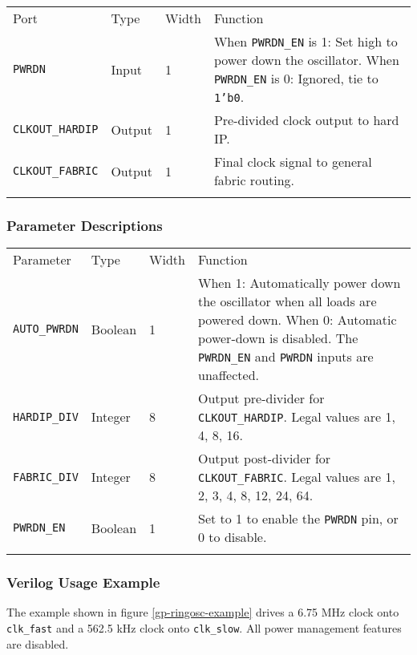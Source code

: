 \documentclass[11pt]{article}
\newcommand{\tokenstyle}[1]{\texttt{#1}}
\newcommand{\wirestyle}[1]{\texttt{#1}}
\newcommand{\datastyle}[1]{\texttt{#1}}
\newcommand{\whenstyle}[1]{{\fontseries{sb}\selectfont#1}}
\newcommand{\thinhline}{\Xhline{1\arrayrulewidth}}
\newcommand{\thickhline}{\Xhline{2.5\arrayrulewidth}}
\begin{document}
\begin{tabularx}{\textwidth}{lllX}
\thinhline
\whenstyle{Port} & \whenstyle{Type} & \whenstyle{Width} & \whenstyle{Function} \\
\thickhline
\tokenstyle{PWRDN} & Input & 1 &
	\whenstyle{When \tokenstyle{PWRDN\_EN} is 1:} Set high to power down the oscillator. \newline
	\whenstyle{When \tokenstyle{PWRDN\_EN} is 0:} Ignored, tie to \datastyle{1'b0}.\\
\thinhline
\tokenstyle{CLKOUT\_HARDIP} & Output & 1 & Pre-divided clock output to hard IP. \\
\thinhline
\tokenstyle{CLKOUT\_FABRIC} & Output & 1 & Final clock signal to general fabric routing. \\
\thinhline
\end{tabularx}

\subsubsection{Parameter Descriptions}

\begin{tabularx}{\textwidth}{lllX}
\thinhline
\whenstyle{Parameter} & \whenstyle{Type} & \whenstyle{Width} & \whenstyle{Function} \\
\thickhline
\tokenstyle{AUTO\_PWRDN} & Boolean & 1 &
	\whenstyle{When 1:} Automatically power down the oscillator when all loads are powered down. \newline
	\whenstyle{When 0:} Automatic power-down is disabled. The \tokenstyle{PWRDN\_EN} and \tokenstyle{PWRDN} inputs are unaffected.\\
\thinhline
\tokenstyle{HARDIP\_DIV} & Integer & 8 &
	Output pre-divider for \tokenstyle{CLKOUT\_HARDIP}. Legal values are 1, 4, 8, 16. \\
\thinhline
\tokenstyle{FABRIC\_DIV} & Integer & 8 &
	Output post-divider for \tokenstyle{CLKOUT\_FABRIC}. Legal values are 1, 2, 3, 4, 8, 12, 24, 64. \\
\thinhline
\tokenstyle{PWRDN\_EN} & Boolean & 1 & Set to 1 to enable the \tokenstyle{PWRDN} pin, or 0 to disable. \\
\thinhline
\end{tabularx}

\pagebreak
\subsubsection{Verilog Usage Example}

The example shown in figure \ref{gp-ringosc-example} drives a 6.75 MHz clock onto \wirestyle{clk\_fast} and a 562.5 kHz clock onto
\wirestyle{clk\_slow}. All power management features are disabled.
\end{document}
